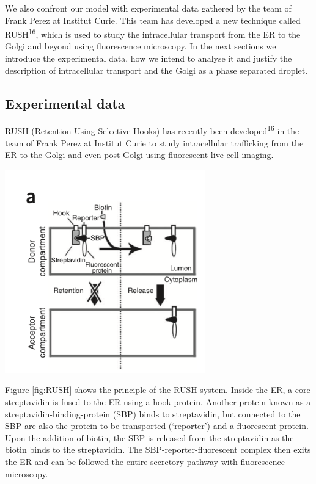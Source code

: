 \documentclass{Dissertate}
\let\origfigure\figure
\let\endorigfigure\endfigure
\renewenvironment{figure}[1][2] {
    \expandafter\origfigure\expandafter[H]
} {
    \endorigfigure
}
\begin{document}
	We also confront our model with experimental data gathered by the team of Frank Perez at Institut Curie. This team has developed a new technique called RUSH\textsuperscript{16}, which is used to study the intracellular transport from the ER to the Golgi and
beyond using fluorescence microscopy. In the next sections we introduce the experimental data, how we intend to analyse it and justify
the description of intracellular transport and the Golgi as a phase separated droplet.

\hypertarget{experimental-data}{%
\subsection{Experimental data}\label{experimental-data}}

RUSH (Retention Using Selective
Hooks) has recently been developed\textsuperscript{16} in the team of
Frank Perez at Institut Curie to study intracellular trafficking from the ER to the Golgi and even
post-Golgi using fluorescent live-cell imaging.

\begin{figure}
\hypertarget{fig:RUSH}{%
\centering
\includegraphics[width=0.65\textwidth]{source/figures/png/RUSH.png}
\caption{Schematic overview of the RUSH system. Image taken from
16}\label{fig:RUSH}
}
\end{figure}

Figure \ref{fig:RUSH} shows the principle of the RUSH system.
Inside the ER, a core streptavidin is fused to the ER using a hook protein.
Another protein known as a streptavidin-binding-protein (SBP) binds to
streptavidin, but connected to the SBP are also the protein to be
transported (`reporter') and a fluorescent protein. Upon the addition of
biotin, the SBP is released from the streptavidin as the biotin binds to
the streptavidin. The SBP-reporter-fluorescent complex then exits the ER and can be
followed the entire secretory pathway with fluorescence microscopy. 
\end{document}
